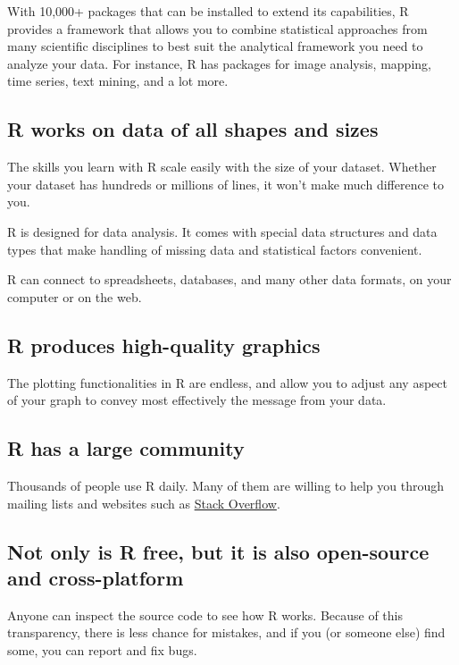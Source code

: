 \documentclass[]{book}
\begin{document}
With 10,000+ packages that can be installed to extend its capabilities,
R provides a framework that allows you to combine statistical approaches
from many scientific disciplines to best suit the analytical framework
you need to analyze your data. For instance, R has packages for image
analysis, mapping, time series, text mining, and a lot more.

\subsection{R works on data of all shapes and
sizes}\label{r-works-on-data-of-all-shapes-and-sizes}

The skills you learn with R scale easily with the size of your dataset.
Whether your dataset has hundreds or millions of lines, it won't make
much difference to you.

R is designed for data analysis. It comes with special data structures
and data types that make handling of missing data and statistical
factors convenient.

R can connect to spreadsheets, databases, and many other data formats,
on your computer or on the web.

\subsection{R produces high-quality
graphics}\label{r-produces-high-quality-graphics}

The plotting functionalities in R are endless, and allow you to adjust
any aspect of your graph to convey most effectively the message from
your data.

\subsection{R has a large community}\label{r-has-a-large-community}

Thousands of people use R daily. Many of them are willing to help you
through mailing lists and websites such as
\href{https://stackoverflow.com/questions/tagged/r}{Stack Overflow}.

\subsection{Not only is R free, but it is also open-source and
cross-platform}\label{not-only-is-r-free-but-it-is-also-open-source-and-cross-platform}

Anyone can inspect the source code to see how R works. Because of this
transparency, there is less chance for mistakes, and if you (or someone
else) find some, you can report and fix bugs.
\end{document}
